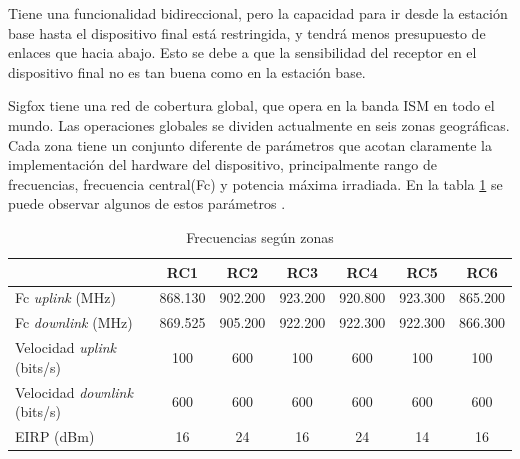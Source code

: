 
Tiene una funcionalidad bidireccional, pero la capacidad para ir desde la estación base hasta el dispositivo final está restringida, y tendrá menos presupuesto de enlaces que hacia abajo. Esto se debe a que la sensibilidad del receptor en el dispositivo final no es tan buena como en la estación base.

Sigfox tiene una red de cobertura global, que opera en la banda ISM en todo el mundo. Las operaciones globales se dividen actualmente en seis zonas geográficas. Cada zona tiene un conjunto diferente de parámetros que acotan claramente la implementación del hardware del dispositivo, principalmente rango de frecuencias, frecuencia central(Fc) y potencia máxima irradiada. En la tabla \ref{tab:ZonasSigfox} se puede observar algunos de estos parámetros \citep{RConfg}.
\begin{table}[h]
    \small
	\centering
	\caption[Zonas de frecuencia]{Frecuencias según zonas}
	\begin{tabular}{l c c c c c c}    
		\toprule
		\textbf{ } 	   & \textbf{RC1} & \textbf{RC2} 	& \textbf{RC3}  & \textbf{RC4}   & \textbf{RC5}	& \textbf{RC6} \\
		\midrule
		Fc \textit{uplink} (MHz)	    & 868.130 	& 902.200	&923.200  &920.800	&923.300 &865.200\\	
		Fc \textit{downlink} (MHz) 	& 869.525	& 905.200   &922.200 &922.300	&922.300	&866.300\\
		Velocidad \textit{uplink} (bits/s)	& 100       &600        &100     &600       &100        &100\\	
		Velocidad \textit{downlink} (bits/s)	& 600       & 600    	&600     & 600       & 600    	&600\\
		EIRP (dBm)		                             	 & 16       & 24		&16     &24	        &14         &16\\
		\bottomrule
		\hline
	\end{tabular}
	\label{tab:ZonasSigfox}
\end{table}

